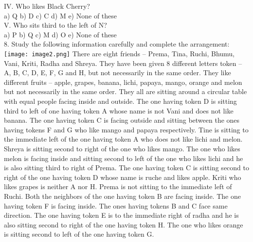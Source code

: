 \documentclass[
]{article}
\begin{document}
IV. Who likes Black Cherry?\\
a) Q \hspace{2mm}b) D \hspace{2mm}c) C \hspace{2mm}d) M \hspace{2mm}e) None of these\\

V. Who sits third to the left of N?\\
a) P \hspace{2mm}b) Q \hspace{2mm}c) M \hspace{2mm}d) O \hspace{2mm}e) None of these\\

8. Study the following information carefully and complete the arrangement:\\
\texttt{[image: image2.png]}
There are eight friends – Prema, Tina, Ruchi, Bhumu, Vani, Kriti, Radha and Shreya. They
have been given 8 different letters token – A, B, C, D, E, F, G and H, but not necessarily in
the same order. They like different fruits – apple, grapes, banana, lichi, papaya, mango,
orange and melon but not necessarily in the same order. They all are sitting around a
circular table with equal people facing inside and outside. The one having token D is sitting
third to left of one having token A whose name is not Vani and does not like banana. The
one having token C is facing outside and sitting between the ones having tokens F and G
who like mango and papaya respectively. Tine is sitting to the immediate left of the one
having token A who does not like lichi and melon. Shreya is sitting second to right of the
one who likes mango. The one who likes melon is facing inside and sitting second to left of
the one who likes lichi and he is also sitting third to right of Prema. The one having token C
is sitting second to right of the one having token D whose name is ruche and likes apple.
Kriti who likes grapes is neither A nor H. Prema is not sitting to the immediate left of Ruchi.
Both the neighbors of the one having token B are facing inside. The one having token F is
facing inside. The ones having tokens B and C face same direction. The one having token E
is to the immediate right of radha and he is also sitting second to right of the one having
token H. The one who likes orange is sitting second to left of the one having token G.\\
\end{document}
